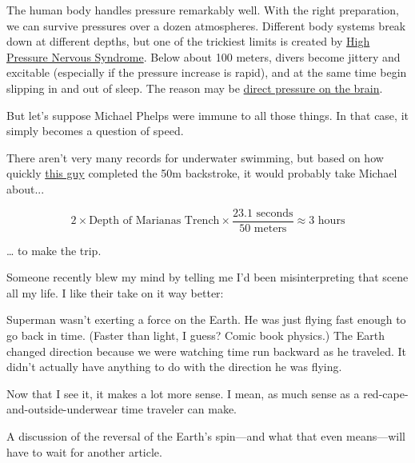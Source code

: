 {The human body handles pressure remarkably well. With the right preparation, we can survive pressures over a dozen atmospheres. Different body systems break down at different depths, but one of the trickiest limits is created by \href{http://archive.rubicon-foundation.org/xmlui/handle/123456789/2661}{High Pressure Nervous Syndrome}. Below about 100 meters, divers become jittery and excitable (especially if the pressure increase is rapid), and at the same time begin slipping in and out of sleep. The reason may be \href{http://jn.physiology.org/content/92/6/3309.full.pdf} {direct pressure on the brain}.}

{But let’s suppose Michael Phelps were immune to all those things. In that case, it simply becomes a question of speed.}

{There aren’t very many records for underwater swimming, but based on how quickly \href{http://www.youtube.com/watch?v=Vox9KOxC1ZA}{this guy} completed the 50m backstroke, it would probably take Michael about...}

{\[ 2\times\text{Depth of Marianas Trench}\times\frac{23.1\textrm{ seconds}}{50\textrm{ meters}}\approx3\textrm{ hours}\]}

{… to make the trip.}


\hfill{}

{Someone recently blew my mind by telling me I’d been misinterpreting that scene all my life. I like their take on it way better:}

{Superman wasn't exerting a force on the Earth. He was just flying fast enough to go back in time. (Faster than light, I guess? Comic book physics.) The Earth changed direction because we were watching time run backward as he traveled. It didn't actually have anything to do with the direction he was flying.}

{Now that I see it, it makes a lot more sense. I mean, as much sense as a red-cape-and-outside-underwear time traveler can make.}

{A discussion of the reversal of the Earth’s spin—and what that even means—will have to wait for another article.}


